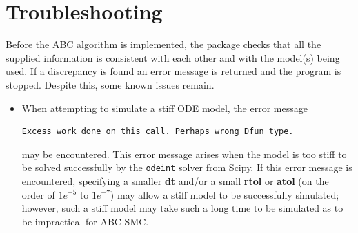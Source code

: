 \documentclass[a4paper]{report}
\begin{document}

\chapter{Troubleshooting} \label{Troubleshooting}
Before the ABC algorithm is implemented, the package checks that all the supplied information is consistent with each other and with the model(s) being used. If a discrepancy is found an error message is returned and the program is stopped. Despite this, some known issues remain.
\begin{itemize}
\item When attempting to simulate a stiff ODE model, the error message
\begin{verbatim}
Excess work done on this call. Perhaps wrong Dfun type.
\end{verbatim}
may be encountered. This error message arises when the model is too stiff to be solved successfully by the \verb$odeint$ solver from Scipy. If this error message is encountered, specifying a smaller \textbf{dt} and/or a small \textbf{rtol} or \textbf{atol} (on the order of $1e^{-5}$ to $1e^{-7}$) may allow a stiff model to be successfully simulated; however, such a stiff model may take such a long time to be simulated as to be impractical for ABC SMC.
\end{itemize}



\end{document}
